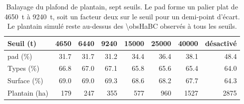 \begin{table}[H]
  \centering
  \caption{Balayage du plafond de plantain, sept seuils. Le \gls{pad} forme un palier plat de
  \SI{4650}{\tonne} à \SI{9240}{\tonne}, soit un facteur deux sur le seuil pour un demi-point
  d'écart. Le plantain simulé reste au-dessus des \SI{\obsHaBC}{\ha} observés à tous les
  seuils.}
  \label{tab:ann-balayage-plantain}
  \small
  \setlength{\tabcolsep}{4pt}
  \begin{tabular}{@{}lrrrrrrr@{}}
    \toprule
    \textbf{Seuil (t)} & \num{4650} & \num{6440} & \num{9240} & \num{15000} & \num{25000}
      & \num{40000} & désactivé \\
    \midrule
    \gls{pad} (\%) & \num{31.7} & \num{31.7} & \num{31.2} & \num{34.4} & \num{36.4}
      & \num{38.1} & \num{48.4} \\
    Types (\%) & \num{66.8} & \num{67.0} & \num{67.1} & \num{65.8} & \num{65.6} & \num{65.4}
      & \num{64.0} \\
    Surface (\%) & \num{69.0} & \num{69.0} & \num{69.3} & \num{68.6} & \num{68.2} & \num{67.7}
      & \num{64.3} \\
    Plantain (ha) & \num{179} & \num{247} & \num{355} & \num{577} & \num{960} & \num{1527}
      & \num{2875} \\
    \bottomrule
  \end{tabular}
\end{table}

